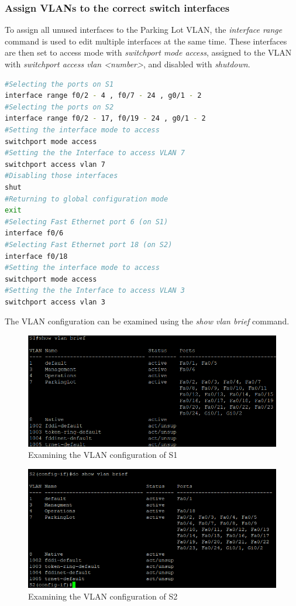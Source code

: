 \documentclass[a4paper]{article}
\newcommand{\ii}{\textit}
\begin{document}
\subsubsection{Assign VLANs to the correct switch interfaces}
To assign all unused interfaces to the Parking Lot VLAN, the \ii{interface range} command is used to edit multiple interfaces at the same time. These interfaces are then set to access mode with \ii{switchport mode access}, assigned to the VLAN with \ii{switchport access vlan <number>}, and disabled with \ii{shutdown}.
\begin{lstlisting}[language=bash]
#Selecting the ports on S1
interface range f0/2 - 4 , f0/7 - 24 , g0/1 - 2	
#Selecting the ports on S2
interface range f0/2 - 17, f0/19 - 24 , g0/1 - 2
#Setting the interface mode to access
switchport mode access
#Setting the the Interface to access VLAN 7
switchport access vlan 7
#Disabling those interfaces
shut
#Returning to global configuration mode
exit
#Selecting Fast Ethernet port 6 (on S1)
interface f0/6
#Selecting Fast Ethernet port 18 (on S2)
interface f0/18
#Setting the interface mode to access
switchport mode access
#Setting the the Interface to access VLAN 3
switchport access vlan 3
\end{lstlisting}
The VLAN configuration can be examined using the \ii{show vlan brief} command.
\begin{figure}[h]
	\includegraphics[scale=0.4]{images/s1_show_vlan_brief.png}
	\centering
	\caption{Examining the VLAN configuration of S1}
\end{figure}
\begin{figure}[h]
	\includegraphics[scale=0.37]{images/s2_show_vlan_brief.png}
	\centering
	\caption{Examining the VLAN configuration of S2}
\end{figure}
\end{document}

